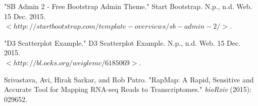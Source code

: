 \documentclass[11pt,letter]{article}
\begin{document}
% 


\begin{thebibliography}{100} %
 "SB Admin 2 - Free Bootstrap Admin Theme." Start Bootstrap. N.p., n.d. Web. 15 Dec. 2015.\\ $<http://startbootstrap.com/template-overviews/sb-admin-2/>$.

"D3 Scatterplot Example." D3 Scatterplot Example. N.p., n.d. Web. 15 Dec. 2015.\\ $<http://bl.ocks.org/weiglemc/6185069>$.

 Srivastava, Avi, Hirak Sarkar, and Rob Patro. "RapMap: A Rapid, Sensitive and Accurate Tool for Mapping RNA-seq Reads to Transcriptomes." \emph{bioRxiv} (2015): 029652.
\end{thebibliography}

% 
\end{document}
